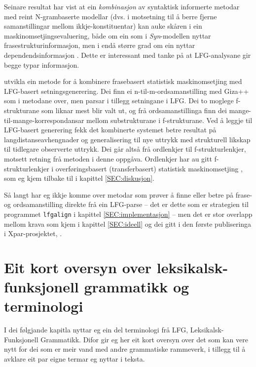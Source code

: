 \documentclass[12pt,a4paper,oneside,draft]{report}
\begin{document}
Seinare resultat har vist at ein \emph{kombinasjon} av syntaktisk
informerte metodar med reint N-grambaserte modellar (dvs. i motsetning
til å berre fjerne samanstillingar mellom ikkje-konstituentar) kan
auke skåren i ein maskinomsetjingsevaluering, både om ein som i
\emph{Syn}-modellen nyttar frasestrukturinformasjon, men i endå større
grad om ein nyttar dependendsinformasjon
\citep{tinsley2007ept,hearne2008ccd}. Dette er interessant med tanke
på at LFG-analysane gir begge typar informasjon.

\citet{riezler2006gmt} utvikla ein metode for å kombinere frasebasert
statistisk maskinomsetjing med LFG-basert setningsgenerering. Dei finn
ei n-til-m-ordsamanstilling med Giza++ som i metodane over, men parsar
i tillegg setningane i LFG. Dei to moglege f-strukturane som liknar
mest blir valt ut, og frå ordsamanstillinga finn dei
mange-til-mange-korrespondansar mellom substrukturane i
f-strukturane. Ved å leggje til LFG-basert generering fekk det
kombinerte systemet betre resultat på langdistanseavhengnader og
generalisering til nye uttrykk med strukturell likskap til tidlegare
observerte uttrykk. Dei går altså frå ordlenkjer til
f-strukturlenkjer, motsett retning frå metoden i denne
oppgåva. Ordlenkjer har au gitt f-strukturlenkjer i overføringsbasert
(transferbasert) statistisk maskinomsetjing
\citep{graham2010dsl,graham2009osr,graham2009fts}, som eg kjem tilbake
til i kapittel \ref{SEC:diskusjon}.

Så langt har eg ikkje komme over metodar som prøver å finne eller
betre på frase- og ordsamanstilling direkte frå ein LFG-parse -- det
er dette som er strategien til programmet \texttt{lfgalign} i kapittel
\ref{SEC:implementasjon} -- men det er stor overlapp mellom krava som
kjem i kapittel \ref{SEC:ideell} og dei gitt i den første publiseringa
i Xpar-prosjektet, \citet{dyvik2009lmp}.

\section{Eit kort oversyn over leksikalsk-funksjonell grammatikk og terminologi}
\label{sec-2.2}

 \label{SEC:omgrepsavklaring}

 I dei følgjande kapitla nyttar eg ein del terminologi frå LFG,
 Leksikalsk-Funksjonell Grammatikk. Difor gir eg her eit kort oversyn
 over det som kan vere nytt for dei som er meir vand med andre
 grammatiske rammeverk, i tillegg til å avklare eit par eigne termar
 eg nyttar i teksta.
\end{document}
